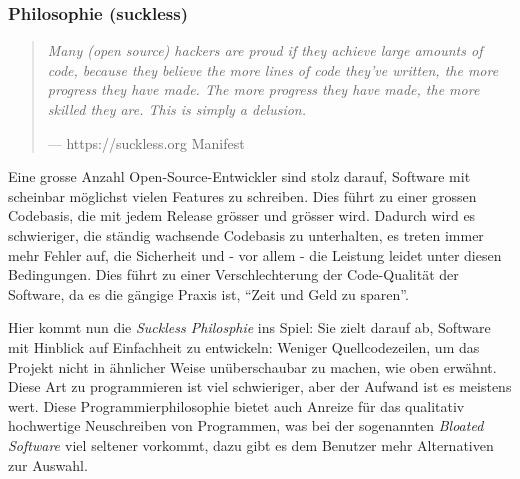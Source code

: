 \documentclass[a4paper,11pt]{article}
\newenvironment{nicequote}[2]{
    \begin{center}\begin{quote}\textit{#1}\\\par\raggedleft--- {#2}
    }{
    \end{quote}\end{center}
}
\begin{document}
\subsubsection{Philosophie (suckless)}

\begin{nicequote}{Many (open source) hackers are proud if they achieve large amounts of code, because they believe the more lines of code they've written, the more progress they have made. The more progress they have made, the more skilled they are. This is simply a delusion.}{https://suckless.org Manifest \cite{suckless}}
\end{nicequote}


Eine grosse Anzahl Open-Source-Entwickler sind stolz darauf, Software mit scheinbar möglichst vielen Features zu schreiben. Dies führt zu einer grossen Codebasis, die mit jedem Release grösser und grösser wird. Dadurch wird es schwieriger, die ständig wachsende Codebasis zu unterhalten, es treten immer mehr Fehler auf, die Sicherheit und - vor allem - die Leistung leidet unter diesen Bedingungen. Dies führt zu einer Verschlechterung der Code-Qualität der Software, da es die gängige Praxis ist, ``Zeit und Geld zu sparen''. \cite{bhattacharya2020}\



Hier kommt nun die \textit{Suckless Philosphie} ins Spiel: Sie zielt darauf ab, Software mit Hinblick auf Einfachheit zu entwickeln: Weniger Quellcodezeilen, um das Projekt nicht in ähnlicher Weise unüberschaubar zu machen, wie oben erwähnt. Diese Art zu programmieren ist viel schwieriger, aber der Aufwand ist es meistens wert. Diese Programmierphilosophie bietet auch Anreize für das qualitativ hochwertige Neuschreiben von Programmen, was bei der sogenannten \textit{Bloated Software \cite{bhattacharya2020}} viel seltener vorkommt, dazu gibt es dem Benutzer mehr Alternativen zur Auswahl.
\end{document}
